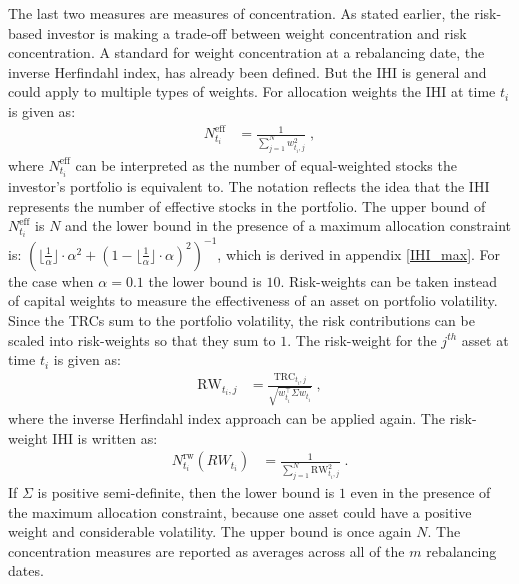 \documentclass[a4paper,11pt,nocenter,bold,noupper,headcount]{mythesis}
\theoremstyle{plain}
\theoremstyle{definition}
\begin{document}
The last two measures are measures of concentration. As stated earlier, the risk-based investor is making a trade-off between weight concentration and risk concentration. A standard for weight concentration at a rebalancing date, the inverse Herfindahl index, has already been defined. But the IHI is general and could apply to multiple types of weights. For allocation weights the IHI at time $t_i$ is given as:
\begin{align}
N^{\text{eff}}_{t_i} &= \frac{1}{\sum_{j = 1}^N w_{t_i, j}^2} \; ,
\end{align}
where $N^{\text{eff}}_{t_i} $ can be interpreted as the number of equal-weighted stocks the investor's portfolio is equivalent to. The notation reflects the idea that the IHI represents the number of effective stocks in the portfolio. The upper bound of $N^{\text{eff}}_{t_i} $ is $N$ and the lower bound in the presence of a maximum allocation constraint is: $ ({\lfloor \frac{1}{\alpha} \rfloor \cdot \alpha^2 + (1- \lfloor \frac{1}{\alpha}\rfloor \cdot \alpha)^2})^{-1}$, which is  derived in appendix \ref{IHI_max}. For the case when $\alpha = 0.1$ the lower bound is $10$. Risk-weights can be taken instead of capital weights to measure the effectiveness of an asset on portfolio volatility. Since the TRCs sum to the portfolio volatility, the risk contributions can be scaled into risk-weights so that they sum to $1$. The risk-weight for the $j^{th}$ asset at time $t_i$ is given as:
\begin{align}
\text{RW}_{t_i, j} &= \frac{\text{TRC}_{t_i, j}}{\sqrt{w_{t_i}^\intercal \Sigma w_{t_i}}}\; ,
 \end{align}
where the inverse Herfindahl index approach can be applied again. The risk-weight IHI is written as:
\begin{align}
N^\mathrm{rw}_{t_i}(RW_{t_i}) &= \frac{1}{\sum_{j = 1}^N \text{RW}_{t_i, j}^2} \;.
\end{align}
If $\Sigma$ is positive semi-definite, then the lower bound is $1$ even in the presence of the maximum allocation constraint, because one asset could have a positive weight and considerable volatility. The upper bound is once again $N$. The concentration measures are reported as averages across all of the $m$ rebalancing dates.
\end{document}
